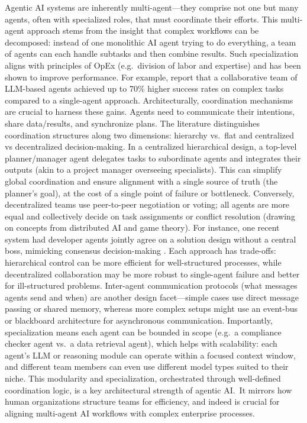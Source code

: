 Agentic AI systems are inherently multi-agent—they comprise not one but many agents, often with specialized roles, that must coordinate their efforts. This multi-agent approach stems from the insight that complex workflows can be decomposed: instead of one monolithic AI agent trying to do everything, a team of agents can each handle subtasks and then combine results. Such specialization aligns with principles of OpEx (e.g.~division of labor and expertise) and has been shown to improve performance. For example, \textcite{shuEffective2024} report that a collaborative team of LLM-based agents achieved up to 70\% higher success rates on complex tasks compared to a single-agent approach. Architecturally, coordination mechanisms are crucial to harness these gains. Agents need to communicate their intentions, share data/results, and synchronize plans. The literature distinguishes coordination structures along two dimensions: hierarchy vs.~flat and centralized vs decentralized decision-making. In a centralized hierarchical design, a top-level planner/manager agent delegates tasks to subordinate agents and integrates their outputs (akin to a project manager overseeing specialists). This can simplify global coordination and ensure alignment with a single source of truth (the planner's goal), at the cost of a single point of failure or bottleneck. Conversely, decentralized teams use peer-to-peer negotiation or voting; all agents are more equal and collectively decide on task assignments or conflict resolution (drawing on concepts from distributed AI and game theory). For instance, one recent system had developer agents jointly agree on a solution design without a central boss, mimicking consensus decision-making \parencite{qianChatDev2024}. Each approach has trade-offs: hierarchical control can be more efficient for well-structured processes, while decentralized collaboration may be more robust to single-agent failure and better for ill-structured problems. Inter-agent communication protocols (what messages agents send and when) are another design facet—simple cases use direct message passing or shared memory, whereas more complex setups might use an event-bus or blackboard architecture for asynchronous communication. Importantly, specialization means each agent can be bounded in scope (e.g.~a compliance checker agent vs.~a data retrieval agent), which helps with scalability: each agent's LLM or reasoning module can operate within a focused context window, and different team members can even use different model types suited to their niche. This modularity and specialization, orchestrated through well-defined coordination logic, is a key architectural strength of agentic AI.~It mirrors how human organizations structure teams for efficiency, and indeed is crucial for aligning multi-agent AI workflows with complex enterprise processes.

